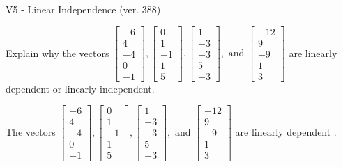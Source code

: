 \begin{exercise}
  \begin{exerciseTitle}V5 - Linear Independence (ver. 388)\end{exerciseTitle}
  \begin{exerciseStatement}
    Explain why the vectors \(\left[\begin{array}{r}
-6 \\
4 \\
-4 \\
0 \\
-1
\end{array}\right] , \left[\begin{array}{r}
0 \\
1 \\
-1 \\
1 \\
5
\end{array}\right] , \left[\begin{array}{r}
1 \\
-3 \\
-3 \\
5 \\
-3
\end{array}\right] , \text{ and } \left[\begin{array}{r}
-12 \\
9 \\
-9 \\
1 \\
3
\end{array}\right]\) are linearly dependent or linearly independent.	


  \end{exerciseStatement}
  \begin{exerciseAnswer}
   The vectors \(\left[\begin{array}{r}
-6 \\
4 \\
-4 \\
0 \\
-1
\end{array}\right] , \left[\begin{array}{r}
0 \\
1 \\
-1 \\
1 \\
5
\end{array}\right] , \left[\begin{array}{r}
1 \\
-3 \\
-3 \\
5 \\
-3
\end{array}\right] , \text{ and } \left[\begin{array}{r}
-12 \\
9 \\
-9 \\
1 \\
3
\end{array}\right]\) are 
  	 linearly dependent  .
  


  \end{exerciseAnswer}
\end{exercise}
